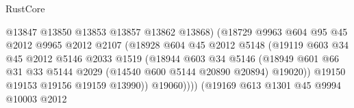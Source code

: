 \begin{lexlean}{RustCore}
\begin{coremodule}
                                        @13847
                                        @13850
                                        @13853
                                        @13857
                                        @13862
                                        @13868)
                                      (@18729
                                        @9963
                                        @604
                                        @95
                                        @45
                                        @2012
                                        @9965
                                        @2012
                                        @2107
                                        (@18928
                                          @604
                                          @45
                                          @2012
                                          @5148
                                          (@19119
                                            @603
                                            @34
                                            @45
                                            @2012
                                            @5146
                                            @2033
                                            @1519
                                            (@18944
                                              @603
                                              @34
                                              @5146
                                              (@18949
                                                @601
                                                @66
                                                @31
                                                @33
                                                @5144
                                                @2029
                                                (@14540 @600 @5144 @20890 @20894)
                                                @19020))
                                            @19150
                                            @19153
                                            @19156
                                            @19159
                                            @13990))
                                        @19060))))
                                (@19169
                                  @613
                                  @1301
                                  @45
                                  @9994
                                  @10003
                                  @2012

\end{coremodule}
\end{lexlean}
